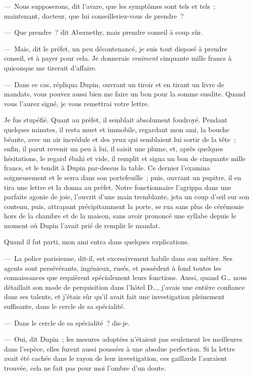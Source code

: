 \documentclass[french,twoside]{book} %
\begin{document}
— Nous supposerons, dit l’avare, que les symptômes sont tels et tels ; maintenant, docteur, que lui conseilleriez-vous de prendre ?\par
— Que prendre ? dit Abernethy, mais prendre conseil à coup sûr.\par
— Mais, dit le préfet, un peu décontenancé, je suis tout disposé à prendre conseil, et à payer pour cela. Je donnerais \emph{vraiment} cinquante mille francs à quiconque me tirerait d’affaire.\par
— Dans ce cas, répliqua Dupin, ouvrant un tiroir et en tirant un livre de mandats, vous pouvez aussi bien me faire un bon pour la somme susdite. Quand vous l’aurez signé, je vous remettrai votre lettre.\par
Je fus stupéfié. Quant au préfet, il semblait absolument foudroyé. Pendant quelques minutes, il resta muet et immobile, regardant mon ami, la bouche béante, avec un air incrédule et des yeux qui semblaient lui sortir de la tête ; enfin, il parut revenir un peu à lui, il saisit une plume, et, après quelques hésitations, le regard ébahi et vide, il remplit et signa un bon de cinquante mille francs, et le tendit à Dupin par-dessus la table. Ce dernier l’examina soigneusement et le serra dans son portefeuille ; puis, ouvrant un pupitre, il en tira une lettre et la donna au préfet. Notre fonctionnaire l’agrippa dans une parfaite agonie de joie, l’ouvrit d’une main tremblante, jeta un coup d’œil sur son contenu, puis, attrapant précipitamment la porte, se rua sans plus de cérémonie hors de la chambre et de la maison, sans avoir prononcé une syllabe depuis le moment où Dupin l’avait prié de remplir le mandat.\par
Quand il fut parti, mon ami entra dans quelques explications.\par
— La police parisienne, dit-il, est excessivement habile dans son métier. Ses agents sont persévérants, ingénieux, rusés, et possèdent à fond toutes les connaissances que requièrent spécialement leurs fonctions. Aussi, quand G… nous détaillait son mode de perquisition dans l’hôtel D…, j’avais une entière confiance dans ses talents, et j’étais sûr qu’il avait fait une investigation pleinement suffisante, dans le cercle de sa spécialité.\par
— Dans le cercle de sa spécialité ? dis-je.\par
— Oui, dit Dupin ; les mesures adoptées n’étaient pas seulement les meilleures dans l’espèce, elles furent aussi poussées à une absolue perfection. Si la lettre avait été cachée dans le rayon de leur investigation, ces gaillards l’auraient trouvée, cela ne fait pas pour moi l’ombre d’un doute.\par
\end{document}
